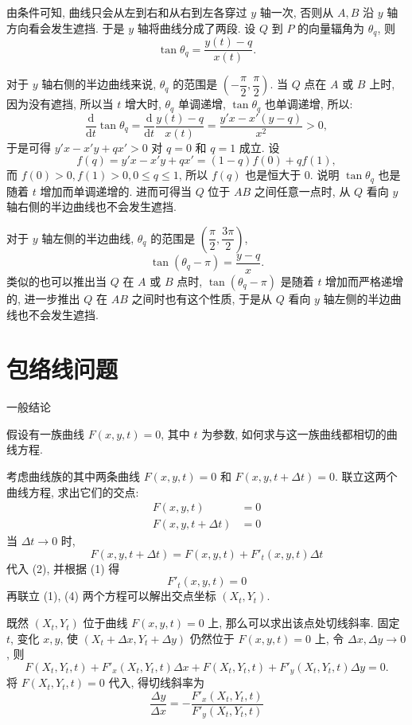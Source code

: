 由条件可知, 曲线只会从左到右和从右到左各穿过 $y$ 轴一次, 否则从 $A,B$ 沿 $y$ 轴方向看会发生遮挡. 于是 $y$ 轴将曲线分成了两段. 设 $Q$ 到 $P$ 的向量辐角为 $\theta_q$, 则 
\[ \tan\theta_q = \frac{y(t) - q}{x(t)} .\]

对于 $y$ 轴右侧的半边曲线来说, $\theta_q$ 的范围是 $(-\dfrac{\pi}{2}, \dfrac{\pi}{2})$. 当 $Q$ 点在 $A$ 或 $B$ 上时, 因为没有遮挡, 所以当 $t$ 增大时, $\theta_q$ 单调递增, $\tan\theta_q$ 也单调递增, 所以:
\[\frac{\mathrm{d}}{\mathrm{d}t}\tan\theta_q = \frac{\mathrm{d}}{\mathrm{d}t}\frac{y(t) - q}{x(t)} = \frac{y'x - x'(y-q)}{x^2} > 0 ,\]
于是可得 $y'x - x'y + qx' > 0$ 对 $q=0$ 和 $q=1$ 成立.
设 
$$f(q) = y'x - x'y + qx' = (1-q)f(0) + qf(1),$$ 
而 $f(0) > 0, f(1) > 0, 0\le q\le 1$, 所以 $f(q)$ 也是恒大于 $0$. 说明 $\tan\theta_q$ 也是随着 $t$ 增加而单调递增的. 进而可得当 $Q$ 位于 $AB$ 之间任意一点时, 从 $Q$ 看向 $y$ 轴右侧的半边曲线也不会发生遮挡.

对于 $y$ 轴左侧的半边曲线, $\theta_q$ 的范围是 $(\dfrac{\pi}{2}, \dfrac{3\pi}{2})$, 
\[ \tan(\theta_q-\pi) = \frac{y-q}{x}.\]
类似的也可以推出当 $Q$ 在 $A$ 或 $B$ 点时, $\tan(\theta_q-\pi)$ 是随着 $t$ 增加而严格递增的, 进一步推出 $Q$ 在 $AB$ 之间时也有这个性质, 于是从 $Q$ 看向 $y$ 轴左侧的半边曲线也不会发生遮挡.

\newpage
\section{包络线问题}

\noindent 一般结论

假设有一族曲线 $F(x,y,t)=0$, 其中 $t$ 为参数, 如何求与这一族曲线都相切的曲线方程.

考虑曲线族的其中两条曲线 $F(x,y,t)=0$ 和 $F(x,y,t+\Delta t)=0$. 联立这两个曲线方程, 求出它们的交点:
\begin{align*}
F(x,y,t) &= 0 \tag{1} \\
F(x,y,t+\Delta t) &= 0 \tag{2}
\end{align*}
当 $\Delta t\to 0$ 时, 
\[ F(x,y,t+\Delta t) = F(x,y,t) + F'_t(x,y,t)\Delta t  \tag{3} \] 
代入 (2), 并根据 (1) 得
\[ F'_t(x,y,t) = 0 \tag{4} \]
再联立 (1), (4) 两个方程可以解出交点坐标 $(X_t, Y_t)$.

既然 $(X_t, Y_t)$ 位于曲线 $F(x,y,t)=0$ 上, 那么可以求出该点处切线斜率. 固定 $t$, 变化 $x,y$, 使 $(X_t+\Delta x, Y_t + \Delta y)$ 仍然位于 $F(x,y,t)=0$ 上, 令 $\Delta x, \Delta y\to 0$, 则
\[ F(X_t,Y_t,t) + F'_x(X_t,Y_t,t)\Delta x + F(X_t,Y_t,t) + F'_y(X_t,Y_t,t)\Delta y = 0 .\]
将 $F(X_t,Y_t,t)=0$ 代入, 得切线斜率为
\[ \frac{\Delta y}{\Delta x} = -\frac{ F'_x(X_t,Y_t,t)}{ F'_y(X_t,Y_t,t)}  \tag{5}\]

